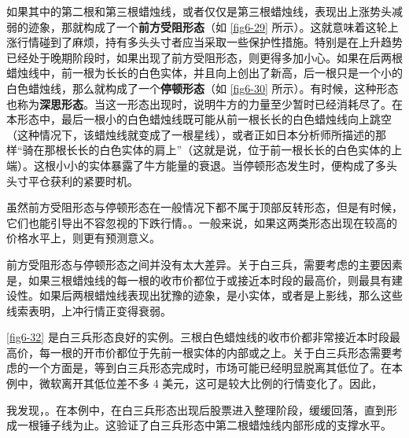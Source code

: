 
如果其中的第二根和第三根蜡烛线，或者仅仅是第三根蜡烛线，表现出上涨势头减弱的迹象，那就构成了一个\textbf{前方受阻形态}（如 \autoref{fig6-29} 所示）。这就意味着这轮上涨行情碰到了麻烦，持有多头头寸者应当采取一些保护性措施。特别是在上升趋势已经处于晚期阶段时，如果出现了前方受阻形态，则更得多加小心。如果在后两根蜡烛线中，前一根为长长的白色实体，并且向上创出了新高，后一根只是一个小的白色蜡烛线，那么就构成了一个\textbf{停顿形态}（如 \autoref{fig6-30} 所示）。有时候，这种形态也称为\textbf{深思形态}。当这一形态出现时，说明牛方的力量至少暂时已经消耗尽了。在本形态中，最后一根小的白色蜡烛线既可能从前一根长长的白色蜡烛线向上跳空（这种情况下，该蜡烛线就变成了一根星线），或者正如日本分析师所描述的那样“骑在那根长长的白色实体的肩上”（这就是说，位于前一根长长的白色实体的上端）。这根小小的实体暴露了牛方能量的衰退。当停顿形态发生时，便构成了多头头寸平仓获利的紧要时机。


虽然前方受阻形态与停顿形态在一般情况下都不属于顶部反转形态，但是有时候，它们也能引导出不容忽视的下跌行情。。一般来说，如果这两类形态出现在较高的价格水平上，则更有预测意义。

前方受阻形态与停顿形态之间并没有太大差异。关于白三兵，需要考虑的主要因素是，如果三根蜡烛线的每一根的收市价都位于或接近本时段的最高价，则最具有建设性。如果后两根蜡烛线表现出犹豫的迹象，是小实体，或者是上影线，那么这些线索表明，上冲行情正变得衰弱。


\autoref{fig6-32} 是白三兵形态良好的实例。三根白色蜡烛线的收市价都非常接近本时段最高价，每一根的开市价都位于先前一根实体的内部或之上。关于白三兵形态需要考虑的一个方面是，等到白三兵形态完成时，市场可能已经明显脱离其低位了。在本例中，微软离开其低位差不多 4 美元，这可是较大比例的行情变化了。因此，

我发现，。在本例中，在白三兵形态出现后股票进入整理阶段，缓缓回落，直到形成一根锤子线为止。这验证了白三兵形态中第二根蜡烛线内部形成的支撑水平。

